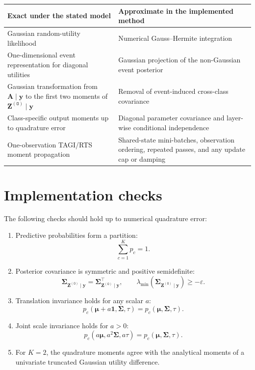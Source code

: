 \documentclass[11pt]{article}
\newcommand{\trans}{\intercal}
\newcommand{\Olayer}{\mathtt{O}}
\begin{document}
\begin{center}
\begin{tabular}{>{\raggedright\arraybackslash}p{}
                >{\raggedright\arraybackslash}p{}}
\toprule
Exact under the stated model & Approximate in the implemented method \\
\midrule
Gaussian random-utility likelihood
& Numerical Gauss--Hermite integration \\
One-dimensional event representation for diagonal utilities
& Gaussian projection of the non-Gaussian event posterior \\
Gaussian transformation from $\bm A\mid\bm y$ to the first two moments of
$\bm Z^{(\Olayer)}\mid\bm y$
& Removal of event-induced cross-class covariance \\
Class-specific output moments up to quadrature error
& Diagonal parameter covariance and layer-wise conditional independence \\
One-observation TAGI/RTS moment propagation
& Shared-state mini-batches, observation ordering, repeated passes, and any
update cap or damping \\
\bottomrule
\end{tabular}
\end{center}

\section{Implementation checks}

The following checks should hold up to numerical quadrature error:
\begin{enumerate}
 \item Predictive probabilities form a partition:
 \begin{equation}
  \sum_{c=1}^{K}p_c=1.
 \end{equation}

 \item Posterior covariance is symmetric and positive semidefinite:
 \begin{equation}
  \bm\Sigma_{\bm Z^{(\Olayer)}\mid\bm y}
  =
  \bm\Sigma_{\bm Z^{(\Olayer)}\mid\bm y}^{\trans},
  \qquad
  \lambda_{\min}
  (\bm\Sigma_{\bm Z^{(\Olayer)}\mid\bm y})
  \ge -\varepsilon.
 \end{equation}

 \item Translation invariance holds for any scalar $a$:
 \begin{equation}
  p_c(\bm\mu+a\bm 1,\bm\Sigma,\tau)
  =p_c(\bm\mu,\bm\Sigma,\tau).
 \end{equation}

 \item Joint scale invariance holds for $a>0$:
 \begin{equation}
  p_c(a\bm\mu,a^2\bm\Sigma,a\tau)
  =p_c(\bm\mu,\bm\Sigma,\tau).
 \end{equation}

 \item For $K=2$, the quadrature moments agree with the analytical moments of
 a univariate truncated Gaussian utility difference.
\end{enumerate}
\end{document}
